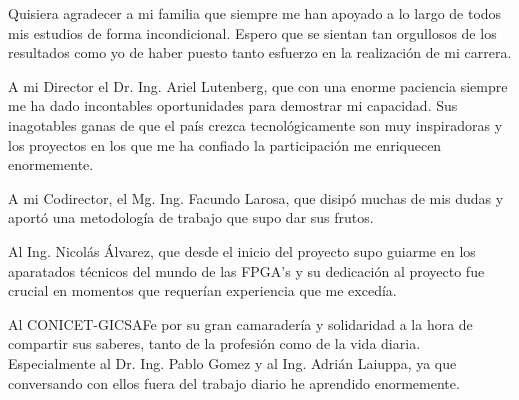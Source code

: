 \documentclass[
11pt, %
spanish,
singlespacing, %
parskip, %
headsepline, %
]{MastersDoctoralThesis} %
\renewcommand{\listtablename}{Índice de Tablas}
\begin{document}
\begin{acknowledgements}
\vspace{1.5cm}

Quisiera agradecer a mi familia que siempre me han apoyado a lo largo de todos mis estudios de forma incondicional. Espero que se sientan tan orgullosos de los resultados como yo de haber puesto tanto esfuerzo en la realización de mi carrera.

A mi Director el Dr. Ing. Ariel Lutenberg, que con una enorme paciencia siempre me ha dado incontables oportunidades para demostrar mi capacidad. Sus inagotables ganas de que el país crezca tecnológicamente son muy inspiradoras y los proyectos en los que me ha confiado la participación me enriquecen enormemente.

A mi Codirector, el Mg. Ing. Facundo Larosa, que disipó muchas de mis dudas y aportó una metodología de trabajo que supo dar sus frutos.

Al Ing. Nicolás Álvarez, que desde el inicio del proyecto supo guiarme en los aparatados técnicos del mundo de las FPGA's y su dedicación al proyecto fue crucial en momentos que requerían experiencia que me excedía.

Al CONICET-GICSAFe por su gran camaradería y solidaridad a la hora de compartir sus saberes, tanto de la profesión como de la vida diaria. Especialmente al Dr. Ing. Pablo Gomez y al Ing. Adrián Laiuppa, ya que conversando con ellos fuera del trabajo diario he aprendido enormemente.

\end{acknowledgements}

\renewcommand{\listtablename}{Índice de Tablas}

\tableofcontents %

\listoffigures %

\listoftables %


\end{document}
